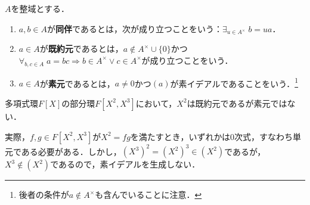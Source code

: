 \documentclass[uplatex,dvipdfmx]{jsreport}
\begin{document}
\begin{definition}
    $A$を整域とする．
    \begin{enumerate}
        \item $a,b\in A$が\textbf{同伴}であるとは，次が成り立つことをいう：$\exists_{u\in A^\times}\;b=ua$．
        \item $a\in A$が\textbf{既約元}であるとは，$a\notin A^\times\cup\{0\}$かつ$\forall_{b,c\in A}\;a=bc\Rightarrow b\in A^\times\lor c\in A^\times$が成り立つことをいう．
        \item $a\in A$が\textbf{素元}であるとは，$a\ne 0$かつ$(a)$が素イデアルであることをいう．\footnote{後者の条件が$a\notin A^\times$も含んでいることに注意．}
    \end{enumerate}
\end{definition}
\begin{example}[多項式環の既約元と素元]
    多項式環$F[X]$の部分環$F[X^2,X^3]$において，$X^2$は既約元であるが素元ではない．

    実際，$f,g\in F[X^2,X^3]$が$X^2=fg$を満たすとき，いずれかは$0$次式，すなわち単元である必要がある．しかし，$(X^3)^2=(X^2)^3\in(X^2)$であるが，$X^3\notin (X^2)$であるので，素イデアルを生成しない．
\end{example}
\end{document}
